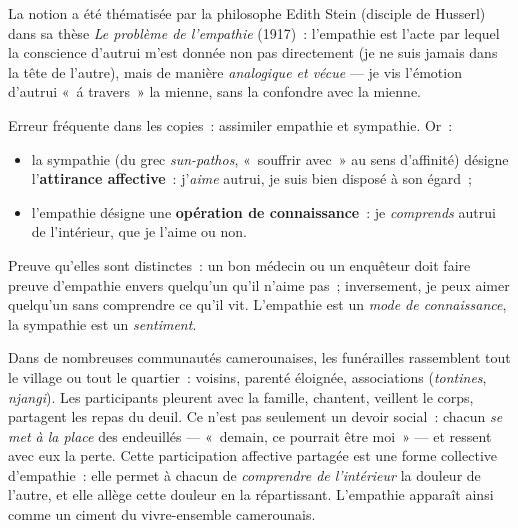 \documentclass[11pt]{article}
\newcommand{\cle}[1]{{\popxbold\color{popdark}#1}}
\begin{document}
La notion a \'et\'e th\'ematis\'ee par la philosophe Edith Stein (disciple de Husserl) dans sa th\`ese \emph{Le probl\`eme de l'empathie} (1917)~: l'empathie est l'acte par lequel la conscience d'autrui m'est donn\'ee non pas directement (je ne suis jamais dans la t\^ete de l'autre), mais de mani\`ere \emph{analogique et v\'ecue} --- je vis l'\'emotion d'autrui «~\'a travers~» la mienne, sans la confondre avec la mienne.

\begin{attention}
Erreur fr\'equente dans les copies~: assimiler empathie et sympathie. Or~:
\begin{itemize}
\item la \cle{sympathie} (du grec \emph{sun-pathos}, «~souffrir avec~» au sens d'affinit\'e) d\'esigne l'\textbf{attirance affective}~: j'\emph{aime} autrui, je suis bien dispos\'e \`a son \'egard~;
\item l'\cle{empathie} d\'esigne une \textbf{op\'eration de connaissance}~: je \emph{comprends} autrui de l'int\'erieur, que je l'aime ou non.
\end{itemize}
Preuve qu'elles sont distinctes~: un bon m\'edecin ou un enqu\^eteur doit faire preuve d'empathie envers quelqu'un qu'il n'aime pas~; inversement, je peux aimer quelqu'un sans comprendre ce qu'il vit. L'empathie est un \emph{mode de connaissance}, la sympathie est un \emph{sentiment}.
\end{attention}

\begin{exemplebox}
Dans de nombreuses communaut\'es camerounaises, les fun\'erailles rassemblent tout le village ou tout le quartier~: voisins, parent\'e \'eloign\'ee, associations (\emph{tontines}, \emph{njangi}). Les participants pleurent avec la famille, chantent, veillent le corps, partagent les repas du deuil. Ce n'est pas seulement un devoir social~: chacun \emph{se met \`a la place} des endeuill\'es --- «~demain, ce pourrait \^etre moi~» --- et ressent avec eux la perte. Cette participation affective partag\'ee est une forme collective d'empathie~: elle permet \`a chacun de \emph{comprendre de l'int\'erieur} la douleur de l'autre, et elle all\`ege cette douleur en la r\'epartissant. L'empathie appara\^it ainsi comme un ciment du vivre-ensemble camerounais.
\end{exemplebox}
\end{document}
